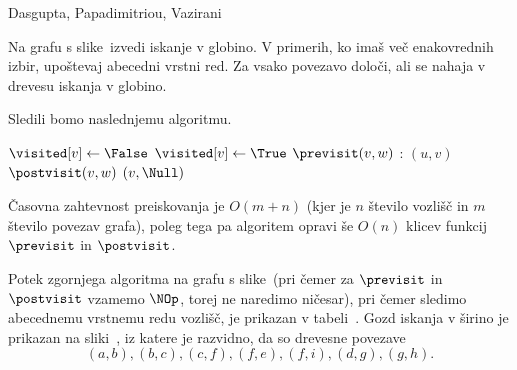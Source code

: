 \begin{naloga}%
{Dasgupta, Papadimitriou, Vazirani}{\cite[Exercise~3.1]{dpv}}
\begin{vprasanje}
Na grafu s slike~\fig[bfs] izvedi iskanje v globino.
V primerih, ko imaš več ena\-ko\-vred\-nih izbir,
upoštevaj abecedni vrstni red.
Za vsako povezavo določi, ali se nahaja v drevesu iskanja v globino.
\end{vprasanje}

\begin{odgovor}
Sledili bomo naslednjemu algoritmu.
\begin{small}
\begin{algorithmic}
		\State $\visited[v] \gets \False$
	\EndFor
        \If{$\visited[v]$}
            \State \Return
        \EndIf
        \State $\visited[v] \gets \True$
        \State $\previsit(v, w)$
		:
            $(u, v)$
		\EndFor
        \State $\postvisit(v, w)$
    \EndFunction
		$(v, \Null)$
	\EndFor
\EndFunction
\end{algorithmic}
\end{small}
Časovna zahtevnost preiskovanja je $O(m + n)$
(kjer je $n$ število vozlišč in $m$ število povezav grafa),
poleg tega pa algoritem opravi
še $O(n)$ klicev funkcij $\previsit$ in $\postvisit$.

Potek zgornjega algoritma na grafu s slike~\fig[bfs]
(pri čemer za $\previsit$ in $\postvisit$ vzamemo $\NOp$,
torej ne naredimo ničesar),
pri čemer sledimo abecednemu vrstnemu redu vozlišč,
je prikazan v tabeli~\tab.
Gozd iskanja v širino je prikazan na sliki~\fig,
iz katere je razvidno, da so drevesne povezave
$$
(a, b), (b, c), (c, f), (f, e), (f, i), (d, g), (g, h).
$$


\end{odgovor}
\end{naloga}
